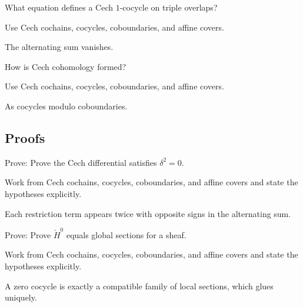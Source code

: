 \begin{exercise}[Cocycle]\label{exr:vi47-expand-04}
What equation defines a Cech $1$-cocycle on triple overlaps?
\end{exercise}
\begin{hint}
Use Cech cochains, cocycles, coboundaries, and affine covers.
\end{hint}
\begin{solution}
The alternating sum vanishes.
\end{solution}

\begin{exercise}[Cohomology]\label{exr:vi47-expand-05}
How is Cech cohomology formed?
\end{exercise}
\begin{hint}
Use Cech cochains, cocycles, coboundaries, and affine covers.
\end{hint}
\begin{solution}
As cocycles modulo coboundaries.
\end{solution}

\subsection*{Proofs}

\begin{exercise}\label{exr:vi47-expand-06}
Prove: Prove the Cech differential satisfies $\delta^2=0$.
\end{exercise}
\begin{hint}
Work from Cech cochains, cocycles, coboundaries, and affine covers and state the hypotheses explicitly.
\end{hint}
\begin{solution}
Each restriction term appears twice with opposite signs in the alternating sum.
\end{solution}

\begin{exercise}[H0]\label{exr:vi47-expand-07}
Prove: Prove $\check H^0$ equals global sections for a sheaf.
\end{exercise}
\begin{hint}
Work from Cech cochains, cocycles, coboundaries, and affine covers and state the hypotheses explicitly.
\end{hint}
\begin{solution}
A zero cocycle is exactly a compatible family of local sections, which glues uniquely.
\end{solution}

